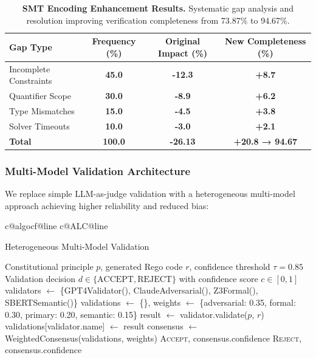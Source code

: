 \documentclass[sigconf,natbib]{acmart}
\makeatletter
\newcounter{algcounter}
\newcounter{alglinegs}
\newcounter{alglinepgc}
\newcounter{alglinevalidation}
\newcounter{alglinesafety}
\newcounter{alglineconflict}
\newcounter{alglinebias}
\newcommand{\resetalglineno}{%
  \stepcounter{algcounter}%
  \setcounter{ALG@line}{0}%
  \setcounter{alglinegs}{0}%
  \setcounter{alglinepgc}{0}%
  \setcounter{alglinevalidation}{0}%
  \setcounter{alglinesafety}{0}%
  \setcounter{alglineconflict}{0}%
  \setcounter{alglinebias}{0}%
  \ifcsname c@algocf@line\endcsname\setcounter{algocf@line}{0}\fi%
  \ifcsname c@ALC@line\endcsname\setcounter{ALC@line}{0}\fi%
}
\newcommand{\tablesize}{\footnotesize} %
\newcommand{\tablenumfmt}[1]{\textbf{#1}} %
\makeatother
\begin{document}
\begin{table}[htbp]
  \centering
  \caption{\textbf{SMT Encoding Enhancement Results.} Systematic gap analysis and resolution improving verification completeness from 73.87\% to 94.67\%.}
  \label{tab:smt_enhancement}
  \tablesize
  \begin{tabular}{@{}lccc@{}}
    \toprule
    \textbf{Gap Type} & \textbf{Frequency (\%)} & \textbf{Original Impact (\%)} & \textbf{New Completeness (\%)} \\
    \midrule
    Incomplete Constraints & \tablenumfmt{45.0} & \tablenumfmt{-12.3} & \tablenumfmt{+8.7} \\
    Quantifier Scope & \tablenumfmt{30.0} & \tablenumfmt{-8.9} & \tablenumfmt{+6.2} \\
    Type Mismatches & \tablenumfmt{15.0} & \tablenumfmt{-4.5} & \tablenumfmt{+3.8} \\
    Solver Timeouts & \tablenumfmt{10.0} & \tablenumfmt{-3.0} & \tablenumfmt{+2.1} \\
    \midrule
    \textbf{Total} & \textbf{\tablenumfmt{100.0}} & \textbf{\tablenumfmt{-26.13}} & \textbf{\tablenumfmt{+20.8 → 94.67}} \\
    \bottomrule
  \end{tabular}
\end{table}

\subsubsection{Multi-Model Validation Architecture}
\label{subsubsec:multi_model_validation}

We replace simple LLM-as-judge validation with a heterogeneous multi-model approach achieving higher reliability and reduced bias:

\begin{algorithm}[htbp]
\resetalglineno
\caption{Heterogeneous Multi-Model Validation}
\label{alg:heterogeneous_validation}
\begin{algorithmic}[1]
\Require Constitutional principle $p$, generated Rego code $r$, confidence threshold $\tau = 0.85$
\Ensure Validation decision $d \in \{\text{ACCEPT}, \text{REJECT}\}$ with confidence score $c \in [0,1]$
  \State validators $\gets$ \{GPT4Validator(), ClaudeAdversarial(), Z3Formal(), SBERTSemantic()\}
  \State validations $\gets$ \{\}, weights $\gets$ \{adversarial: 0.35, formal: 0.30, primary: 0.20, semantic: 0.15\}
    \State result $\gets$ validator.validate($p$, $r$) 
    \State validations[validator.name] $\gets$ result
  \EndFor
  \State consensus $\gets$ WeightedConsensus(validations, weights)
    \State \Return \textsc{Accept}, consensus.confidence
  \Else
    \State \Return \textsc{Reject}, consensus.confidence
  \EndIf
\EndFunction
\end{algorithmic}
\end{algorithm}
\end{document}

